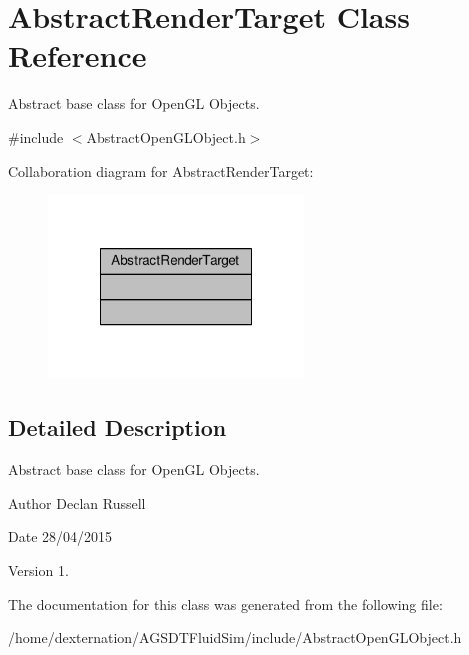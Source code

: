 \hypertarget{class_abstract_render_target}{\section{Abstract\-Render\-Target Class Reference}
\label{class_abstract_render_target}
}


Abstract base class for Open\-G\-L Objects.  




{\ttfamily \#include $<$Abstract\-Open\-G\-L\-Object.\-h$>$}



Collaboration diagram for Abstract\-Render\-Target\-:\nopagebreak
\begin{figure}[H]
\begin{center}
\leavevmode
\includegraphics[width=192pt]{class_abstract_render_target__coll__graph}
\end{center}
\end{figure}


\subsection{Detailed Description}
Abstract base class for Open\-G\-L Objects. 

\begin{DoxyAuthor}{Author}
Declan Russell 
\end{DoxyAuthor}
\begin{DoxyDate}{Date}
28/04/2015 
\end{DoxyDate}
\begin{DoxyVersion}{Version}
1. 
\end{DoxyVersion}


The documentation for this class was generated from the following file\-:\begin{DoxyCompactItemize}
\item 
/home/dexternation/\-A\-G\-S\-D\-T\-Fluid\-Sim/include/Abstract\-Open\-G\-L\-Object.\-h\end{DoxyCompactItemize}
